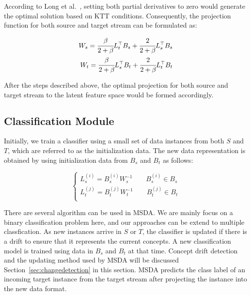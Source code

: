 According to Long et al.~\cite{long2008general}, setting both partial derivatives to zero would generate the optimal solution based on KTT conditions.
Consequently, the projection function for both source and target stream can be formulated as:

\begin{equation}
\begin{split}
    W_s = \cfrac{\beta}{2+\beta} L_{t}^\top B_{s} + \cfrac{2}{2+\beta} L_{s}^\top B_{s} \\
    W_t = \cfrac{\beta}{2+\beta} L_{s}^\top B_{t} + \cfrac{2}{2+\beta} L_{t}^\top B_{t} \\
\end{split}
\end{equation}

After the steps described above, the optimal projection for both source and target stream to the latent feature space would be formed accordingly. 



\subsection{Classification Module}

Initially, we train a classifier using a small set of data instances from both $S$ and $T$, which are referred to as the initialization data. The new data representation is obtained by using initialization data from $B_s$ and $B_t$ as follows:

\begin{equation}
\begin{cases}
L_s^{(i)}=B_s^{(i)}W_s^{-1} \qquad B_s^{(i)}\in B_s \\
L_t^{(j)}=B_t^{(j)}W_t^{-1} \qquad {B}_t^{(j)}\in {B}_t\\
\end{cases}
\end{equation}

There are several algorithm can be used in MSDA. We are mainly focus on a binary classification problem here, and our approaches can be extend to multiple classfication. As new instances arrive in $S$ or $T$, the classifier is updated if there is a drift to ensure that it represents the current concepts. A new classification model is trained using data in $B_s$ and $B_t$ at that time. Concept drift detection and the updating method used by MSDA will be discussed Section~\ref{sec:changedetection} in this section. MSDA predicts the  class label of an incoming target instance from the target stream after projecting the instance into the new data format.


